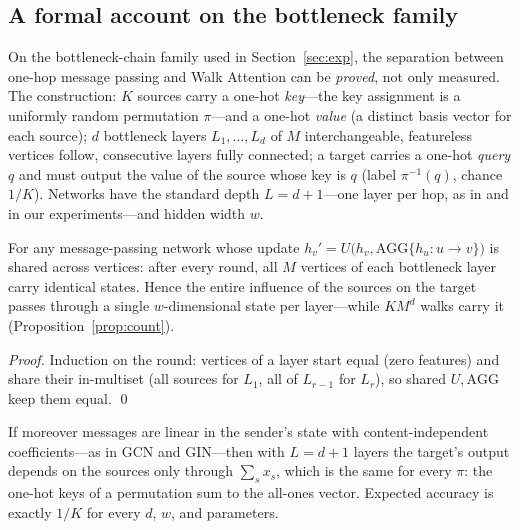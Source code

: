\documentclass[runningheads]{llncs}
\begin{document}
\subsection{A formal account on the bottleneck family}\label{sec:theory}

On the bottleneck-chain family used in Section~\ref{sec:exp}, the separation
between one-hop message passing and Walk Attention can be \emph{proved}, not
only measured. The construction: $K$ sources carry a one-hot \emph{key}---the
key assignment is a uniformly random permutation $\pi$---and a one-hot
\emph{value} (a distinct basis vector for each source); $d$ bottleneck layers $L_1,\dots,L_d$ of $M$ interchangeable,
featureless vertices follow, consecutive layers fully connected; a target
carries a one-hot \emph{query} $q$ and must output the value of the source
whose key is $q$ (label $\pi^{-1}(q)$, chance $1/K$). Networks have the
standard depth $L=d+1$---one layer per hop, as in \cite{alon2021bottleneck} and
in our experiments---and hidden width $w$.

\begin{proposition}\label{prop:collapse}
For any message-passing network whose update
$h_v'=U\bigl(h_v,\mathrm{AGG}\{h_u:u\to v\}\bigr)$ is shared across vertices:
after every round, all $M$ vertices of each bottleneck layer carry identical
states. Hence the entire influence of the sources on the target passes through
a single $w$-dimensional state per layer---while $K M^{d}$ walks carry it
(Proposition~\ref{prop:count}).
\end{proposition}

\begin{proof}
Induction on the round: vertices of a layer start equal (zero features) and
share their in-multiset (all sources for $L_1$, all of $L_{r-1}$ for $L_r$), so
shared $U,\mathrm{AGG}$ keep them equal. \qed
\end{proof}

\begin{proposition}\label{prop:blind}
If moreover messages are linear in the sender's state with content-independent
coefficients---as in GCN and GIN---then with $L=d+1$ layers the target's output
depends on the sources only through $\sum_s x_s$, which is the same for every
$\pi$: the one-hot keys of a permutation sum to the all-ones vector. Expected
accuracy is exactly $1/K$ for every $d$, $w$, and parameters.
\end{proposition}
\end{document}

